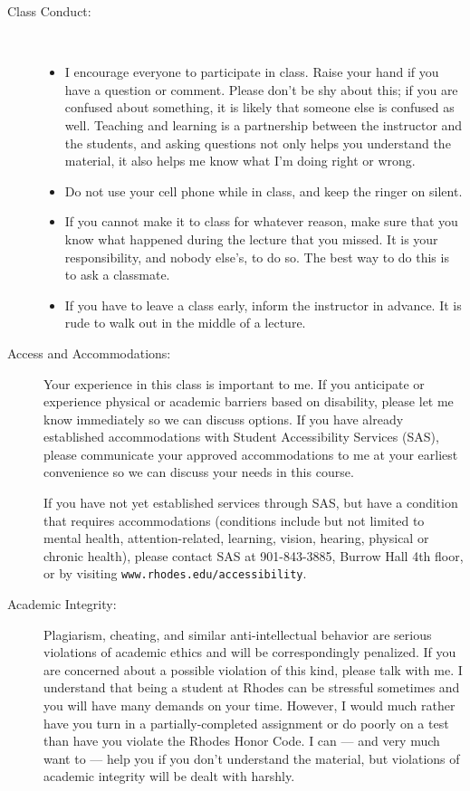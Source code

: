 \documentclass [letterpaper,11pt]{article}
\begin{document}
\begin{description}
\item[Class Conduct:] \
   \begin{itemize}\setlength{\itemsep}{0em}\setlength{\parskip}{0pt}
   	\item I encourage everyone to participate in class.  Raise your hand if you have
	a question or comment.  Please don't be shy about this; if you are confused about
	something, it is likely that someone else is confused as well.
		Teaching and learning is a partnership between the instructor and the students, and asking questions not only helps you understand the material, it also
		helps me know what I'm doing right or wrong.
			     \item Do not use your cell phone while in class, and 
			     keep the ringer on silent.
			          \item  If you cannot make it to class for whatever reason, make sure that
       you know what happened during the lecture that you missed. It is
       your responsibility, and nobody else's, to do so.  The best way to do this is
       to ask a classmate.  
     \item  If you have to leave a class early, inform the instructor in
       advance. It is rude to walk out in the middle of a
       lecture. 
     \end{itemize}
   
\item[Access and Accommodations:]
Your experience in this class is important to me.  If you anticipate or experience physical or academic barriers based on disability, please let me know immediately so we can discuss options.  If you have already established accommodations with Student Accessibility Services (SAS), please communicate your approved accommodations to me at your earliest convenience so we can discuss your needs in this course.

If you have not yet established services through SAS, but have a condition that requires accommodations (conditions include but not limited to mental health, attention-related, learning, vision, hearing, physical or chronic health), please contact SAS at 901-843-3885, Burrow Hall 4th floor, or by visiting  \texttt{www.rhodes.edu/accessibility}.
  

  
\item[Academic Integrity:]
   Plagiarism, cheating, and similar anti-intellectual behavior are serious violations of academic ethics and will be correspondingly penalized. If you are concerned about a possible violation of this kind, please talk with me.  I understand that being a student at Rhodes 
can be stressful sometimes and you will have many demands on your time.  However, I would
much rather have you turn in a partially-completed assignment or do poorly on a test than
have you violate the Rhodes Honor Code.  I can --- and very much want to --- help you if you don't understand the material, but violations of academic integrity will be dealt with harshly.
   

\end{description}
\end{document}
